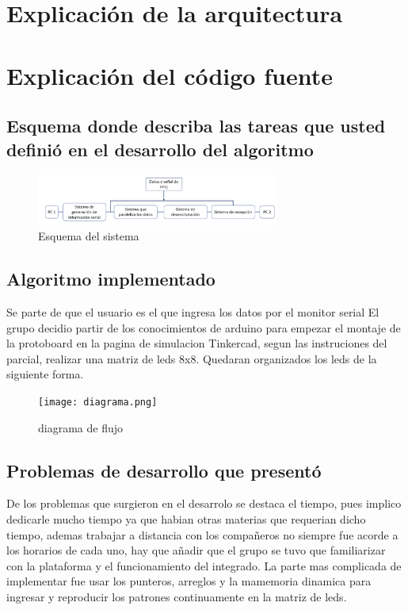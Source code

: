 \documentclass{article}
\begin{document}
\section{Explicación de la arquitectura} 



\section{Explicación del código fuente} 

\subsection{Esquema donde describa las tareas que usted definió en el desarrollo del algoritmo}
    \begin{figure}[h]
    \includegraphics[width=8cm]{Sistema.png}
    \centering
    \caption{Esquema del sistema}
    \label{fig:esquema}
    \end{figure}

\subsection{Algoritmo implementado}
Se parte de que el usuario es el que ingresa los datos por el monitor serial
El grupo decidio partir de los conocimientos de arduino para empezar el montaje de la protoboard en la pagina de simulacion Tinkercad, segun las instruciones del parcial, realizar una matriz de leds 8x8.
Quedaran organizados los leds de la siguiente forma.
    
    \begin{figure}[h]
    \texttt{[image: diagrama.png]}
    \centering
    \caption{diagrama de flujo}
    \label{fig:diagrama}
    \end{figure}

\subsection{Problemas de desarrollo que presentó}
De los problemas que surgieron en el desarrolo se destaca el tiempo, pues implico dedicarle mucho tiempo ya que habian otras materias que requerian dicho tiempo, ademas trabajar a distancia con los compañeros no siempre fue acorde a los horarios de cada uno, hay que añadir que el grupo se tuvo que familiarizar con la plataforma y el funcionamiento del integrado.
La parte mas complicada de implementar fue usar los punteros, arreglos y la mamemoria dinamica para ingresar y reproducir los patrones continuamente en la matriz de leds.
\end{document}
